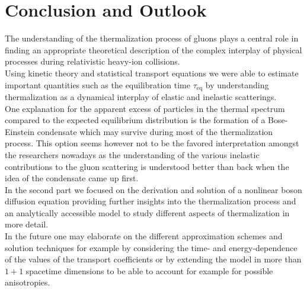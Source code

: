 \section{Conclusion and Outlook}
The understanding of the thermalization process of gluons plays a central role in finding an appropriate theoretical description of the complex interplay of physical processes during relativistic heavy-ion collisions. \\
\noindent
Using kinetic theory and statistical transport equations we were able to estimate important quantities such as the equilibration time $\tau_{\mathrm{eq}}$ by understanding thermalization as a dynamical interplay of elastic and inelastic scatterings. \\
\noindent
One explanation for the apparent excess of particles in the thermal spectrum compared to the expected equilibrium distribution is the formation of a Bose-Einstein condensate which may survive during most of the thermalization process. This option seems however not to be the favored interpretation amongst the researchers nowadays as the understanding of the various inelastic contributions to the gluon scattering is understood better than back when the idea of the condensate came up first.\\
\noindent
In the second part we focused on the derivation and solution of a nonlinear boson diffusion equation providing further insights into the thermalization process and an analytically accessible model to study different aspects of thermalization in more detail.\\
\noindent
In the future one may elaborate on the different approximation schemes and solution techniques for example by considering the time- and energy-dependence of the values of the transport coefficients or by extending the model in more than $1+1$ spacetime dimensions to be able to account for example for possible anisotropies.